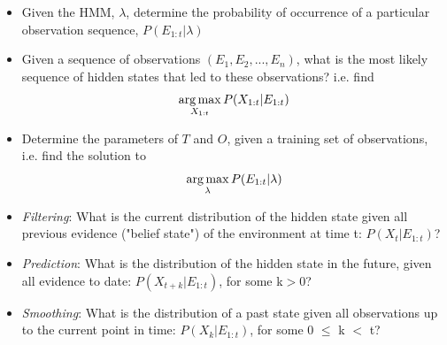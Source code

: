 \begin{itemize}

    \item Given the HMM, $\lambda$, determine the probability of occurrence of a particular observation sequence, $P(E_{1:t} | \lambda)$
    
    \item Given a sequence of observations $(E_1, E_2, ..., E_n)$, what is the most likely sequence of hidden states that led to these observations? i.e. find \[\operatorname*{arg\,max}_{X_{1:t}} P(X_{1:t} | E_{1:t})\]
    
    \item Determine the parameters of $T$ and $O$, given a training set of observations, i.e. find the solution to \[\operatorname*{arg\,max}_{\lambda} P(E_{1:t} | \lambda)\]
    
    \item \textit{Filtering}: What is the current distribution of the hidden state given all previous evidence ("belief state") of the environment at time t: $P(X_t | E_{1:t})$?
    
    \item \textit{Prediction}: What is the distribution of the hidden state in the future, given all evidence to date: $P(X_{t+k} | E_{1:t})$, for some k$>$0?
    
    \item \textit{Smoothing}: What is the distribution of a past state given all observations up to the current point in time: $P(X_k | E_{1:t})$, for some 0 $\leq$ k $<$ t?
    
\end{itemize}
\par


